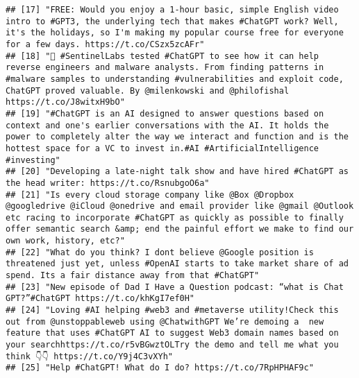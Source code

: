 \documentclass[
]{article}
\begin{document}
\begin{verbatim}
## [17] "FREE: Would you enjoy a 1-hour basic, simple English video intro to #GPT3, the underlying tech that makes #ChatGPT work? Well, it's the holidays, so I'm making my popular course free for everyone for a few days. https://t.co/CSzx5zcAFr"                                                                   
## [18] "🤖 #SentinelLabs tested #ChatGPT to see how it can help reverse engineers and malware analysts. From finding patterns in #malware samples to understanding #vulnerabilities and exploit code, ChatGPT proved valuable. By @milenkowski and @philofishal https://t.co/J8witxH9bO"                               
## [19] "#ChatGPT is an AI designed to answer questions based on context and one's earlier conversations with the AI. It holds the power to completely alter the way we interact and function and is the hottest space for a VC to invest in.#AI #ArtificialIntelligence #investing"                                    
## [20] "Developing a late-night talk show and have hired #ChatGPT as the head writer: https://t.co/RsnubgoO6a"                                                                                                                                                                                                         
## [21] "Is every cloud storage company like @Box @Dropbox @googledrive @iCloud @onedrive and email provider like @gmail @Outlook etc racing to incorporate #ChatGPT as quickly as possible to finally offer semantic search &amp; end the painful effort we make to find our own work, history, etc?"                  
## [22] "What do you think? I dont believe @Google position is threatened just yet, unless #OpenAI starts to take market share of ad spend. Its a fair distance away from that #ChatGPT"                                                                                                                                
## [23] "New episode of Dad I Have a Question podcast: “what is Chat GPT?”#ChatGPT https://t.co/khKgI7ef0H"                                                                                                                                                                                                             
## [24] "Loving #AI helping #web3 and #metaverse utility!Check this out from @unstoppableweb using @ChatwithGPT We’re demoing a  new feature that uses #ChatGPT AI to suggest Web3 domain names based on your searchhttps://t.co/r5vBGwztOLTry the demo and tell me what you think 👇👇 https://t.co/Y9j4C3vXYh"        
## [25] "Help #ChatGPT! What do I do? https://t.co/7RpHPHAF9c"                                                                                                                                                                                                                                                          

\end{verbatim}
\end{document}
